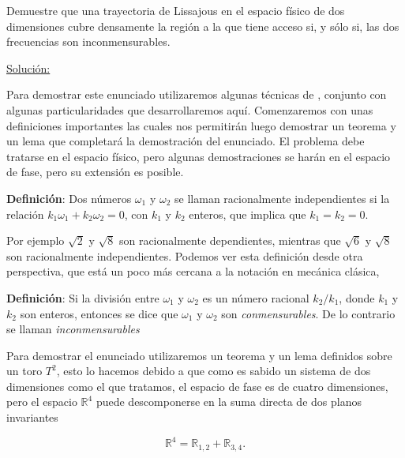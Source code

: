 \documentclass[a4paper,10pt]{article}
\numberwithin{equation}{section}
\begin{document}
Demuestre que una trayectoria de Lissajous en el espacio físico de dos 
dimensiones cubre densamente la región a la que tiene acceso si, y sólo si,
las dos frecuencias son inconmensurables.

\vspace{.3cm}

\underline{Solución:} \vspace{.3cm}

Para demostrar este enunciado utilizaremos algunas técnicas de \cite{arnold}, conjunto
con algunas particularidades que desarrollaremos aquí. Comenzaremos con unas definiciones 
importantes las cuales nos permitirán luego demostrar un teorema y un lema que completará
la demostración del enunciado. El problema debe tratarse en el espacio físico, pero 
algunas demostraciones se harán en el espacio de fase, pero su extensión es 
posible.

\vspace{.3cm}

\textbf{Definición}: Dos números $\omega_1$ y $\omega_2$ se llaman racionalmente independientes si la 
relación $k_1\omega_1 + k_2\omega_2 = 0$, con $k_1$ y $k_2$ enteros, que implica que 
$k_1 = k_2 = 0$.

\vspace{.3cm}

Por ejemplo $\sqrt{2}$ y $\sqrt{8}$ son racionalmente dependientes, mientras que 
$\sqrt{6}$ y $\sqrt{8}$ son racionalmente independientes. Podemos ver esta definición
desde otra perspectiva, que está un poco más cercana a la notación en mecánica clásica,

\vspace{.3cm}

\textbf{Definición}: Si la división entre $\omega_1$ y $\omega_2$ es un número 
racional $k_2/k_1$, donde $k_1$ y $k_2$ son enteros, entonces se dice que $\omega_1$ y
$\omega_2$ son \emph{conmensurables}. De lo contrario se llaman \emph{inconmensurables}

\vspace{.3cm}

Para demostrar el enunciado utilizaremos un teorema y un lema definidos sobre un 
toro $T^2$, esto lo hacemos debido a que como es sabido un sistema de dos dimensiones 
como el que tratamos, el espacio de fase es de cuatro dimensiones, pero el espacio $\mathbb{R}^4$
puede descomponerse en la suma directa de dos planos invariantes 

\begin{equation}
 \mathbb{R}^4 = \mathbb{R}_{1,2} + \mathbb{R}_{3,4}.
\end{equation}
\end{document}
